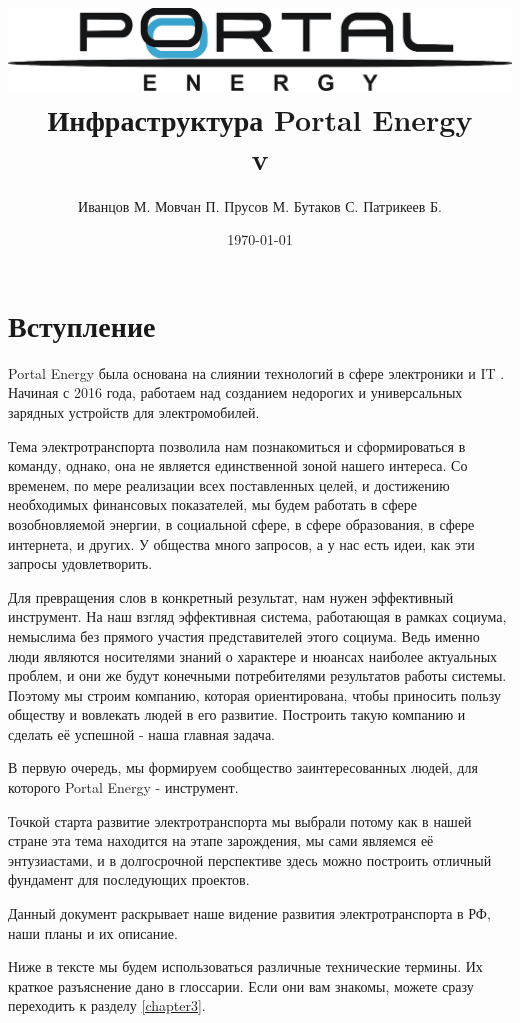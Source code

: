 \documentclass[a4paper,12pt]{report}
\title{\includegraphics[width=14cm]{logo}\\[2cm]Инфраструктура Portal Energy \\\normalsize v\versionnumber}
\author{Иванцов М. Мовчан П. Прусов М. Бутаков С. Патрикеев Б.}
\date{\today}
\begin{document}
%
\maketitle
\tableofcontents
\clearpage


\chapter{Вступление}

Portal Energy была основана на слиянии технологий в сфере электроники и IT . Начиная с 2016 года, работаем над созданием недорогих и универсальных зарядных устройств для электромобилей. 

Тема электротранспорта позволила нам познакомиться и сформироваться в команду, однако, она не является единственной зоной нашего интереса. Со временем, по мере реализации всех поставленных целей, и достижению необходимых финансовых показателей, мы будем работать в сфере возобновляемой энергии, в социальной сфере, в сфере образования, в сфере интернета, и других. У общества много запросов, а у нас есть идеи, как эти запросы удовлетворить. 

Для превращения слов в конкретный результат, нам нужен эффективный инструмент. На наш взгляд эффективная система, работающая в рамках социума, немыслима без прямого участия представителей этого социума. Ведь именно люди являются носителями знаний о характере и нюансах наиболее актуальных проблем, и они же будут конечными потребителями результатов работы системы. Поэтому мы строим компанию, которая ориентирована, чтобы приносить пользу обществу и вовлекать людей в его развитие. Построить такую компанию и сделать её успешной - наша главная задача. 

В первую очередь, мы формируем сообщество заинтересованных людей, для которого Portal Energy -  инструмент.

Точкой старта развитие электротранспорта мы выбрали потому как в нашей стране эта тема находится на этапе зарождения, мы сами являемся её энтузиастами, и в долгосрочной перспективе здесь можно построить отличный фундамент для последующих проектов. 

Данный документ раскрывает наше видение развития электротранспорта в РФ, наши планы и их описание.



Ниже в тексте мы будем использоваться различные технические термины. Их краткое разъяснение дано в глоссарии. Если они вам знакомы, можете сразу переходить к разделу \ref{chapter3}.
\end{document}
